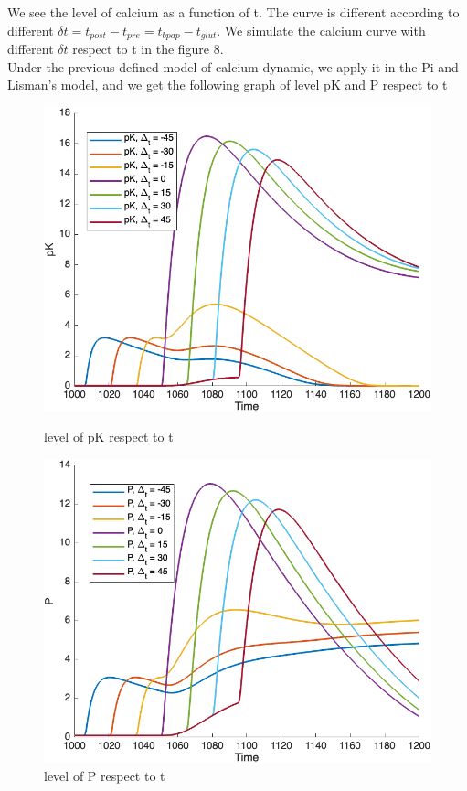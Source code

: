 \documentclass{article}
\begin{document}
We see the level of calcium as a function of t. The curve is different according to different $\delta t=t_{post}-t_{pre}=t_{bpap}-t_{glut}$. We simulate the calcium curve with different $\delta t$ respect to t in the figure 8.\\


 Under the previous defined model of calcium dynamic, we apply it in the Pi  and Lisman's model, and we get the following graph of level pK and P respect to t
 
\begin{figure}[h]
    \begin{minipage}{.45\linewidth}
        \centering
        \includegraphics[width=.95\linewidth]{pK.png}
        \caption{level of pK respect to t}
        \label{fig:fig4}
    \end{minipage}
    \hfill
    \begin{minipage}{.45\linewidth}
        \centering
        \includegraphics[width=.95\linewidth]{P.png}
        \caption{level of P respect to t}
        \label{fig:fig5}
    \end{minipage}
\end{figure}
\end{document}
